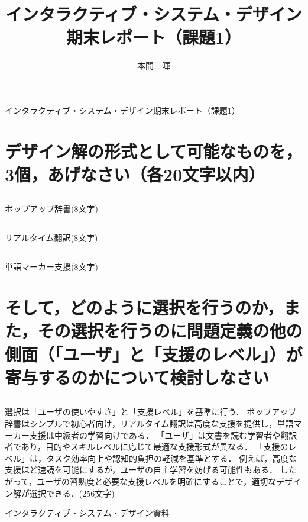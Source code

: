 \documentclass[titlepage,a4paper]{jsarticle}
\title{インタラクティブ・システム・デザイン期末レポート（課題1）}
\author{本間三暉}
\renewcommand{\thesubsection}{\thesection-\arabic{subsection})}
\begin{document}
\maketitle
\begin{center}
  インタラクティブ・システム・デザイン期末レポート（課題1）
\end{center}
\section{デザイン解の形式として可能なものを，3個，あげなさい（各20文字以内）}
\subsection{ }
ポップアップ辞書(8文字)
\subsection{ }
リアルタイム翻訳(8文字)
\subsection{ }
単語マーカー支援(8文字)
\section{そして，どのように選択を行うのか，また，その選択を行うのに問題定義の他の側面（「ユーザ」と「支援のレベル」）が寄与するのかについて検討しなさい}
\renewcommand{\thesubsection}{\thesection)}
\subsection{ }
選択は「ユーザの使いやすさ」と「支援レベル」を基準に行う．
ポップアップ辞書はシンプルで初心者向け，リアルタイム翻訳は高度な支援を提供し，単語マーカー支援は中級者の学習向けである．
「ユーザ」は文書を読む学習者や翻訳者であり，目的やスキルレベルに応じて最適な支援形式が異なる．
「支援のレベル」は，タスク効率向上や認知的負担の軽減を基準とする．
例えば，高度な支援ほど速読を可能にするが，ユーザの自主学習を妨げる可能性もある．
したがって，ユーザの習熟度と必要な支援レベルを明確にすることで，適切なデザイン解が選択できる．(256文字)
\begin{thebibliography}{99}
  インタラクティブ・システム・デザイン資料
\end{thebibliography}
\end{document}
